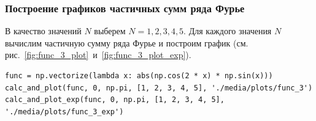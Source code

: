 \subsubsection{Построение графиков частичных сумм ряда Фурье}
В качество значений $N$ выберем $N = 1, 2, 3, 4, 5$. Для каждого значения $N$ вычислим частичную сумму ряда Фурье и построим график (см. рис.~\ref{fig:func_3_plot}~и~\ref{fig:func_3_plot_exp}).

\begin{lstlisting}[style=python_white, caption=Построение графиков частичных сумм ряда Фурье, label=lst:func_1_plot]
func = np.vectorize(lambda x: abs(np.cos(2 * x) * np.sin(x)))
calc_and_plot(func, 0, np.pi, [1, 2, 3, 4, 5], './media/plots/func_3')
calc_and_plot_exp(func, 0, np.pi, [1, 2, 3, 4, 5], './media/plots/func_3_exp')
\end{lstlisting}

